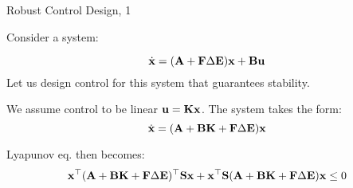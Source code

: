 \documentclass{beamer}
\begin{document}
\begin{frame}{Robust Control Design, 1}
	\begin{flushleft}
		
		Consider a system: 
		
		\begin{equation}
			\dot{\mathbf{x}} = (\mathbf{A} + \mathbf{F} \Delta \mathbf{E})\mathbf{x} + \mathbf{B}\mathbf{u}
		\end{equation}
		Let us design control for this system that guarantees stability.
		
		\bigskip
		
		We assume control to be linear $\mathbf{u} = \mathbf{K}\mathbf{x}$. The system takes the form:
		\begin{equation}
			\dot{\mathbf{x}} = (\mathbf{A} + \mathbf{B}\mathbf{K} + \mathbf{F} \Delta \mathbf{E})\mathbf{x}
		\end{equation}
		
		Lyapunov eq. then becomes:
		\begin{equation}
			\mathbf{x}^\top(\mathbf{A} + \mathbf{B}\mathbf{K} + \mathbf{F} \Delta \mathbf{E})^\top\mathbf{S}\mathbf{x}
			+
			\mathbf{x}^\top \mathbf{S} (\mathbf{A} + \mathbf{B}\mathbf{K} + \mathbf{F} \Delta \mathbf{E})\mathbf{x} \leq 0
		\end{equation}
		
		
		
	\end{flushleft}
\end{frame}
\end{document}
